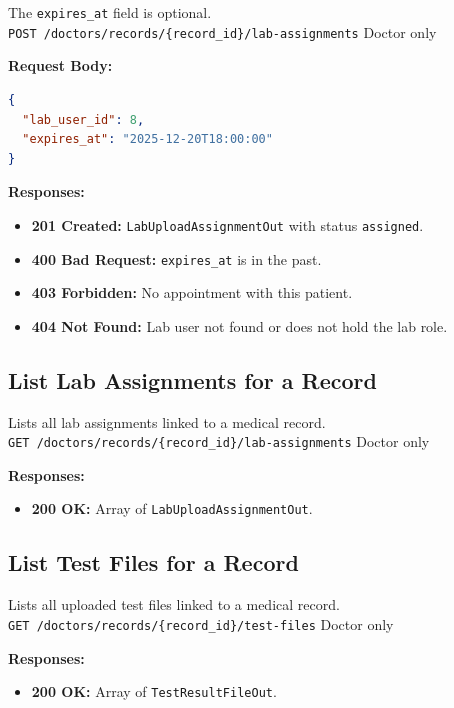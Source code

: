 \documentclass[a4paper,12pt]{report}
\begin{document}
The \texttt{expires\_at} field is optional. \\
\texttt{POST /doctors/records/\{record\_id\}/lab-assignments} \hfill Doctor only

\noindent\textbf{Request Body:}
\begin{lstlisting}[language=json]
{
  "lab_user_id": 8,
  "expires_at": "2025-12-20T18:00:00"
}
\end{lstlisting}

\noindent\textbf{Responses:}
\begin{itemize}
    \item \textbf{201 Created:} \texttt{LabUploadAssignmentOut} with status \texttt{assigned}.
    \item \textbf{400 Bad Request:} \texttt{expires\_at} is in the past.
    \item \textbf{403 Forbidden:} No appointment with this patient.
    \item \textbf{404 Not Found:} Lab user not found or does not hold the lab role.
\end{itemize}

\subsection{List Lab Assignments for a Record}

Lists all lab assignments linked to a medical record. \\
\texttt{GET /doctors/records/\{record\_id\}/lab-assignments} \hfill Doctor only

\noindent\textbf{Responses:}
\begin{itemize}
    \item \textbf{200 OK:} Array of \texttt{LabUploadAssignmentOut}.
\end{itemize}

\subsection{List Test Files for a Record}

Lists all uploaded test files linked to a medical record. \\
\texttt{GET /doctors/records/\{record\_id\}/test-files} \hfill Doctor only

\noindent\textbf{Responses:}
\begin{itemize}
    \item \textbf{200 OK:} Array of \texttt{TestResultFileOut}.
\end{itemize}
\end{document}
